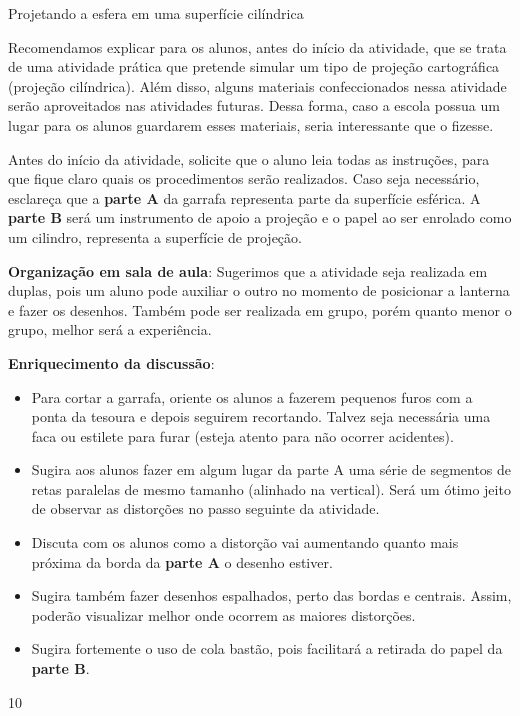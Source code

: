 \begin{sugestions}{Projetando a esfera em uma superfície cilíndrica}
{
  Recomendamos explicar para os alunos, antes do início da atividade, que se trata de uma atividade prática que pretende simular um tipo de projeção cartográfica (projeção cilíndrica). Além disso, alguns materiais confeccionados nessa atividade serão aproveitados nas atividades futuras. Dessa forma, caso a escola possua um lugar para os alunos guardarem esses materiais, seria interessante que o fizesse.
  
   Antes do início da atividade, solicite que o aluno leia todas as instruções, para que fique claro quais os procedimentos serão realizados. Caso seja necessário, esclareça que a \textbf{parte A} da garrafa representa parte da superfície esférica. A \textbf{parte B }será um instrumento de apoio a projeção e o papel ao ser enrolado como um cilindro, representa a superfície de projeção.

  \textbf{Organização em sala de aula}: Sugerimos que a atividade seja realizada em duplas, pois um aluno pode auxiliar o outro no momento de posicionar a lanterna e fazer os desenhos. Também pode ser realizada em grupo, porém quanto menor o grupo, melhor será a experiência.

  \textbf{Enriquecimento da discussão}:
\begin{itemize}
\item  Para cortar a garrafa, oriente os alunos a fazerem pequenos furos com a ponta da tesoura e depois seguirem recortando. Talvez seja necessária uma faca ou estilete para furar (esteja atento para não ocorrer acidentes).

\item Sugira aos alunos fazer em algum lugar da parte A uma série de segmentos de retas paralelas de mesmo tamanho (alinhado na vertical). Será um ótimo jeito de observar as distorções no passo seguinte da atividade.

\item Discuta com os alunos como a distorção vai aumentando quanto mais próxima da borda da\textbf{ parte A} o desenho estiver.

 \item Sugira também fazer desenhos espalhados, perto das bordas e centrais. Assim, poderão visualizar melhor onde ocorrem as maiores distorções.

\item Sugira fortemente o uso de cola bastão, pois facilitará a retirada do papel da \textbf{parte B}.
\end{itemize}
 
}{1}{0}
\end{sugestions}
